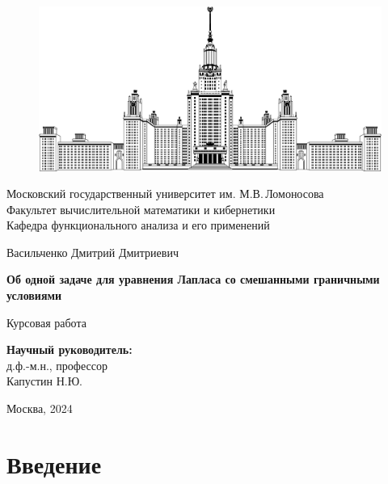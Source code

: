 \documentclass[a4paper, 12pt]{article}
\numberwithin{equation}{section}
\numberwithin{lemma}{section}
\numberwithin{definition}{section}
\numberwithin{notabene}{section}
\numberwithin{corollary}{section}
\begin{document}
\begin{figure}
	\begin{center}
		\includegraphics[width=0.6\linewidth]{MSU_logo.png}
	\end{center}
\end{figure}

\begin{center}
	Московский государственный университет им. М.В.\,Ломоносова\\
	Факультет вычислительной математики и кибернетики\\
 	Кафедра функционального анализа и его применений\\

	\vspace{12ex}

	\large{Васильченко Дмитрий Дмитриевич}

    \bigskip

    \large{
      \bf Об одной задаче для уравнения Лапласа со смешанными граничными условиями
    }

    \vspace{12ex}
    \normalsize{Курсовая работа}
\end{center}

\vspace{12ex}

\begin{flushright}
	{\bf Научный руководитель:}\\ д.ф.-м.н., профессор\\ Капустин Н.Ю.
\end{flushright}

\vspace{15ex}

\begin{center} Москва, 2024 \end{center}

\thispagestyle{empty}
\newpage
\tableofcontents
\newpage

\section{Введение}
\end{document}
